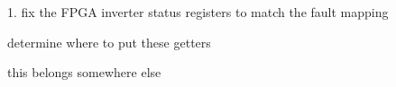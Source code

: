 
\begin{DoxyRefList}
\item[Member \mbox{\hyperlink{interface_accessors_8h_a1cdd34e87e38eafe4bccb1db4f8dd63e}{get\+Bridge\+AVoltage\+Ok}} (void)]\label{todo__todo000003}%
%
1. fix the FPGA inverter status registers to match the fault mapping
\begin{DoxyEnumerate}
\item determine where to put these getters  
\end{DoxyEnumerate}
\item[Member \mbox{\hyperlink{application_8h_ae8d2212f7c053cff78f8630589545e61}{J1939\+\_\+\+INTERFACE\+\_\+\+DEFAULTS}} (...)]\label{todo__todo000001}%
%
this belongs somewhere else 
\end{DoxyRefList}